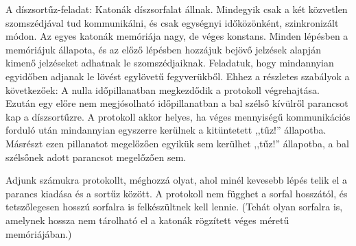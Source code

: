 \begin{Exercise}[counter={sorszam}, difficulty=0]
	A díszsortűz-feladat: Katonák díszsorfalat állnak. Mindegyik csak a két közvetlen szomszédjával tud kommunikálni, és csak egységnyi időközönként, szinkronizált módon. Az egyes katonák memóriája nagy, de véges konstans. Minden lépésben a memóriájuk állapota, és az előző lépésben hozzájuk bejövő jelzések alapján kimenő jelzéseket adhatnak le szomszédjaiknak. Feladatuk, hogy mindannyian egyidőben adjanak le lövést egylövetű fegyverükből. Ehhez a részletes szabályok a következőek: A nulla időpillanatban megkezdődik a protokoll végrehajtása. Ezután egy előre nem megjósolható időpillanatban a bal szélső kívülről parancsot kap a díszsortűzre. A protokoll akkor helyes, ha véges mennyiségű kommunikációs forduló után mindannyian egyszerre kerülnek a kitüntetett ,,tűz!'' állapotba. Másrészt ezen pillanatot megelőzően egyikük sem kerülhet ,,tűz!'' állapotba, a bal szélsőnek adott parancsot megelőzően sem.
	
	Adjunk számukra protokollt, méghozzá olyat, ahol minél kevesebb lépés telik el a parancs kiadása és a sortűz között. A protokoll nem függhet a sorfal hosszától, és tetszőlegesen hosszú sorfalra is felkészültnek kell lennie. (Tehát olyan sorfalra is, amelynek hossza nem tárolható el a katonák rögzített véges méretű memóriájában.)
	
\end{Exercise}

